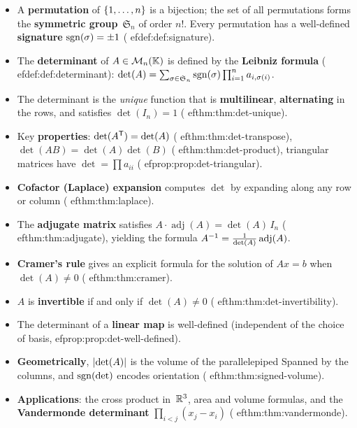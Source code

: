 \begin{itemize}
  \item A \textbf{permutation} of $\left\{1,\ldots,n\right\}$
    is a bijection; the set of all permutations forms the
    \textbf{symmetric group}~$\mathfrak{S}_n$ of order $n!$.
    Every permutation has a well-defined
    \textbf{signature}
    $\operatorname{sgn}(\sigma)=\pm 1$ (
ef{def:def:signature}).

  \item The \textbf{determinant} of
    $A\in\mathcal{M}_n({\mathbb{K}})$ is defined by the \textbf{Leibniz formula}
    (
ef{def:def:determinant}):
    $\det(A) = \sum_{\sigma\in\mathfrak{S}_n}\operatorname{sgn}(\sigma)
    \prod_{i=1}^n a_{i,\sigma(i)}$.

  \item The determinant is the \emph{unique} function that is
    \textbf{multilinear}, \textbf{alternating} in the rows, and
    satisfies $\det(I_n)=1$ (
ef{thm:thm:det-unique}).

  \item Key \textbf{properties}: $\det({A}^{\mathsf{T}})=\det(A)$
    (
ef{thm:thm:det-transpose}), $\det(AB)=\det(A)\det(B)$
    (
ef{thm:thm:det-product}), triangular matrices have
    $\det=\prod a_{ii}$ (
ef{prop:prop:det-triangular}).

  \item \textbf{Cofactor (Laplace) expansion}
    computes $\det$ by expanding along any row or column
    (
ef{thm:thm:laplace}).

  \item The \textbf{adjugate matrix} satisfies
    $A\cdot\operatorname{adj}(A) = \det(A)\,I_n$
    (
ef{thm:thm:adjugate}), yielding the formula
    ${A}^{-1}=\frac{1}{\det(A)}\operatorname{adj}(A)$.

  \item \textbf{Cramer's rule} gives an explicit
    formula for the solution of $Ax=b$ when $\det(A)\neq 0$
    (
ef{thm:thm:cramer}).

  \item $A$ is \textbf{invertible} if and only if $\det(A)\neq 0$
    (
ef{thm:thm:det-invertibility}).

  \item The determinant of a \textbf{linear map} is well-defined
    (independent of the choice of basis, 
ef{prop:prop:det-well-defined}).

  \item \textbf{Geometrically}, $\lvert\det(A)\rvert$ is the volume of the
    parallelepiped Spanned by the columns, and $\operatorname{sgn}(\det)$ encodes
    orientation (
ef{thm:thm:signed-volume}).

  \item \textbf{Applications}: the cross product in~${\mathbb{R}}^3$, area and
    volume formulas, and the \textbf{Vandermonde
    determinant}
    $\prod_{i<j}(x_j-x_i)$ (
ef{thm:thm:vandermonde}).
\end{itemize}
